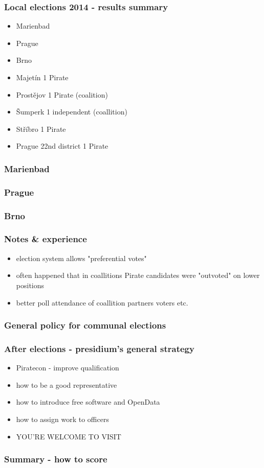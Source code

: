 \begin{frame}
	\frametitle{Local elections 2014 - results summary}
	\begin{itemize}
	\item Marienbad
	\item Prague
	\item Brno
	\item Majet\'in 1 Pirate
	\item Prost\v{e}jov 1 Pirate (coalition)
	\item \v{S}umperk 1 independent (coallition)
	\item St\v{r}\'ibro 1 Pirate
	\item Prague 22nd district 1 Pirate
	\end{itemize}
\end{frame}
\begin{frame}
	\frametitle{Marienbad}
\end{frame}
\begin{frame}
	\frametitle{Prague}
\end{frame}
\begin{frame}
	\frametitle{Brno}
\end{frame}
\begin{frame}
	\frametitle{Notes \& experience}
	\begin{itemize}
		\item election system allows "preferential votes"
		\item often happened that in coallitions Pirate candidates were "outvoted" on lower positions
		\item better poll attendance of coallition partners voters etc.
	\end{itemize}
\end{frame}
\begin{frame}
	\frametitle{General policy for communal elections}
\end{frame}
\begin{frame}
	\frametitle{After elections - presidium's general strategy}
	\begin{itemize}
		\item Piratecon - improve qualification
		\item how to be a good representative
		\item how to introduce free software and OpenData
		\item how to assign work to officers
		\item YOU'RE WELCOME TO VISIT
	\end{itemize}
\end{frame}
\begin{frame}
	\frametitle{Summary - how to score}
\end{frame}